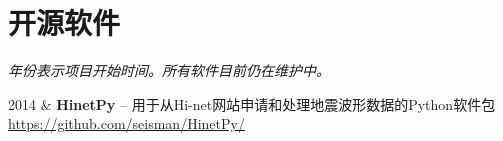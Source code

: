 \section{开源软件}

\emph{年份表示项目开始时间。所有软件目前仍在维护中。}

\begin{EntriesTable}{0.05}{0.02}{0.93}
       2014 & \textbf{HinetPy} -- 用于从Hi-net网站申请和处理地震波形数据的Python软件包 \newline
       \url{https://github.com/seisman/HinetPy/} \\
\end{EntriesTable}
